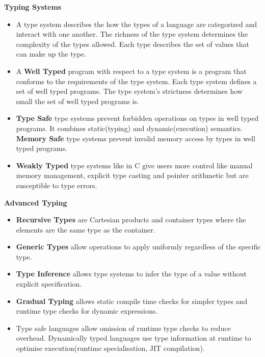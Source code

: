 \begin{center}
     \textbf{Typing Systems}
\end{center}
\begin{itemize}
    \item A type system describes the how the types of a language are categorized and interact with one another. The richness of the type system determines the complexity of the types allowed. Each type describes the set of values that can make up the type. 
    \item A \textbf{Well Typed} program with respect to a type system is a program that conforms to the requirements of the type system. Each type system defines a set of well typed programs. The type system's strictness determines how small the set of well typed programs is.
    \item \textbf{Type Safe} type systems prevent forbidden operations on types in well typed programs. It combines static(typing) and dynamic(execution) semantics. \textbf{Memory Safe} type systems prevent invalid memory access by types in well typed programs. 
    \item \textbf{Weakly Typed} type systems like in C give users more control like manual memory management, explicit type casting and pointer arithmetic but are susceptible to type errors.
\end{itemize}

\begin{center}
     \textbf{Advanced Typing}
\end{center}
\begin{itemize}
    \item \textbf{Recursive Types} are Cartesian products and container types where the elements are the same type as the container.
    \item \textbf{Generic Types} allow operations to apply uniformly regardless of the specific type. 
    \item \textbf{Type Inference} allows type systems to infer the type of a value without explicit specification.
    \item \textbf{Gradual Typing} allows static compile time checks for simpler types and runtime type checks for dynamic expressions.
    \item Type safe languages allow omission of runtime type checks to reduce overhead. Dynamically typed languages use type information at runtime to optimise execution(runtime specialisation, JIT compilation).
\end{itemize}